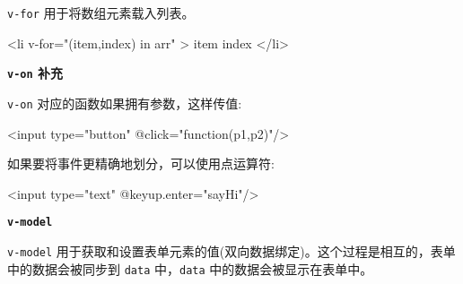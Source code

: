 \texttt{v-for} 用于将数组元素载入列表。

\begin{HTML}
<li v-for="(item,index) in arr" >
    {{item}} {{index}}
</li>
\end{HTML}



\noindent\textbf{\texttt{v-on} 补充}

\texttt{v-on} 对应的函数如果拥有参数，这样传值:

\begin{HTML}
<input type="button" @click="function(p1,p2)"/>
\end{HTML}

如果要将事件更精确地划分，可以使用点运算符:

\begin{HTML}
<input type="text" @keyup.enter="sayHi"/>
\end{HTML}

\noindent\textbf{\texttt{v-model}}

\texttt{v-model} 用于获取和设置表单元素的值(双向数据绑定)。这个过程是相互的，表单中的数据会被同步到 \texttt{data} 中，\texttt{data} 中的数据会被显示在表单中。


\newpage